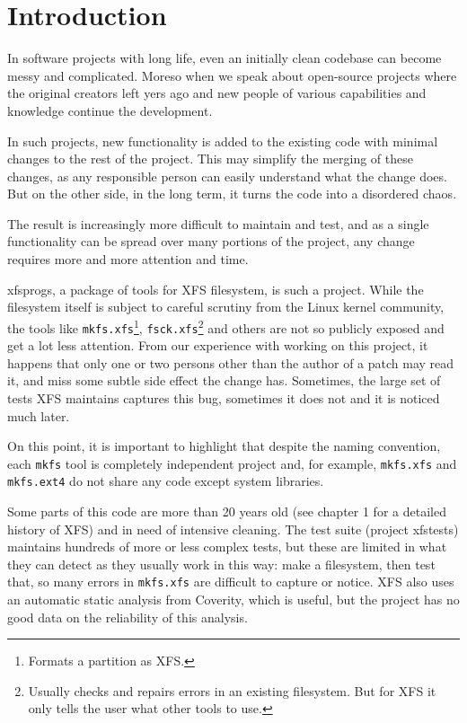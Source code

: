 
\chapter{Introduction}\label{chap:introduction}


In software projects with long life, even an initially clean codebase can
become messy and complicated. Moreso when we speak about open-source
projects where the original creators left yers ago and new people of
various capabilities and knowledge continue the development.

In such projects, new functionality is added to the existing code with
minimal changes to the rest of the project. This may simplify the merging
of these changes, as any responsible person can easily understand what the
change does. But on the other side, in the long term, it turns the code into
a disordered chaos.

The result is increasingly more difficult to maintain and test, and as a single functionality can be spread over many portions of the project, any change requires more and more attention and time.

xfsprogs, a package of tools for XFS filesystem, is such a project. While
the filesystem itself is subject to careful scrutiny from the Linux kernel
community, the tools like {\tt mkfs.xfs}\footnote{Formats a
partition as XFS.}, {\tt fsck.xfs}\footnote{Usually checks and repairs errors in an
existing filesystem. But for XFS it only tells the user what other
tools to use.} and others are not so publicly exposed and get a
lot less attention. From our experience with working on this project, it
happens that only one or two persons other than the author of a patch may read
it, and miss some subtle side effect the change has. Sometimes, the large
set of tests XFS maintains captures this bug, sometimes it does not and it
is noticed much later.

On this point, it is important to highlight that despite the naming
convention, each {\tt mkfs} tool is completely independent project and, for
example, {\tt mkfs.xfs} and {\tt mkfs.ext4} do not share any code except
system libraries.

Some parts of this code are more than 20 years old (see chapter 1 for a
detailed history of XFS) and in need of intensive cleaning. The test
suite (project xfstests) maintains hundreds of more or less complex tests,
but these are limited in what they can detect as they usually work in this
way: make a filesystem, then test that, so many errors in {\tt mkfs.xfs}
are difficult to capture or notice. XFS also uses an automatic static
analysis from Coverity, which is useful, but the project has no good data
on the reliability of this analysis.

